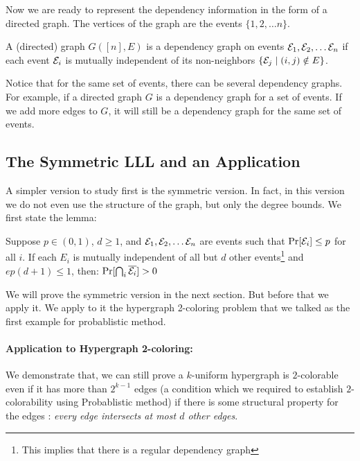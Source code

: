 Now we are ready to represent the dependency information in the form of a directed graph. The vertices of the graph are the events $\{1,2, \ldots n\}$. 
\begin{definition}
A (directed) graph $G([n],E)$ is a dependency graph on events ${\cal E}_1, {\cal E}_2, \ldots {\cal E}_n$
if each event ${\cal E}_i$ is mutually independent of its non-neighbors $\{{\cal E}_j \mid (i,j) \notin E \}$.
\end{definition}

\begin{remark}
Notice that for the same set of events, there can be several dependency graphs. For example, if a directed graph $G$ is a dependency graph for a set of events. If we add more edges to $G$, it will still be a dependency graph for the same set of events.
\end{remark}

\subsection{The Symmetric LLL and an Application}

A simpler version to study first is the symmetric version. In fact, in this version we do not even use the structure of the graph, but only the degree bounds. We first state the lemma:

\begin{lemma}
Suppose $p \in (0,1)$, $d \ge 1$, and ${\cal E}_1, {\cal E}_2, \ldots {\cal E}_n$
are events such that $\Pr[{\cal E}_i] \le p$ for all $i$. If each $E_i$ is mutually independent of all but $d$ other events\footnote{This implies that there is a regular dependency graph} and $ep(d+1) \le 1$, then:
$\Pr[\bigcap_{i} \overline{{\cal E}_i}] > 0$
\end{lemma}

We will prove the symmetric version in the next section. But before that we apply it. We apply to it the hypergraph 2-coloring problem that we talked as the first example for probablistic method. 

\vspace{-4mm}
\paragraph{Application to Hypergraph 2-coloring:}
We demonstrate that, we can still prove a $k$-uniform hypergraph is $2$-colorable even if it has more than $2^{k-1}$ edges (a condition which we required to establish $2$-colorability using Probablistic method) if there is some structural property for the edges : \textit{every edge intersects at most $d$ other edges}.

